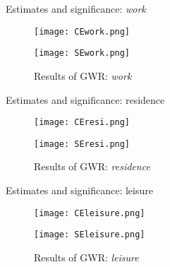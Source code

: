 \documentclass[aspectratio=169,xcolor=dvipsnames]{beamer}
\begin{document}
\begin{frame}{Estimates and significance: \textit{work}}
	\begin{figure}[h]
	\centering
	\begin{minipage}[b]{0.49\textwidth}
		\texttt{[image: CEwork.png]}
		\caption{Coefficient of \textit{work}}
		\label{fig:CE_work}
	\end{minipage}
	\hfill %
	\begin{minipage}[b]{0.49\textwidth}
		\texttt{[image: SEwork.png]}
		\caption{Significance of \textit{work}}
		\label{fig:SE_work}
	\end{minipage}
	\caption{Results of GWR: \textit{work}}
	\end{figure}
\end{frame}
\begin{frame}{Estimates and significance: residence}
	\begin{figure}[h]
		\centering
		\begin{minipage}[b]{0.49\textwidth}
			\texttt{[image: CEresi.png]}
			\caption{Coefficient of \textit{residence}}
			\label{fig:CE_resi}
		\end{minipage}
		\hfill %
		\begin{minipage}[b]{0.49\textwidth}
			\texttt{[image: SEresi.png]}
			\caption{Significance of \textit{residence}}
			\label{fig:SE_resi}
		\end{minipage}
		\caption{Results of GWR: \textit{residence}}
	\end{figure}
\end{frame}
\begin{frame}{Estimates and significance: leisure}
	\begin{figure}[h]
		\centering
		\begin{minipage}[b]{0.49\textwidth}
			\texttt{[image: CEleisure.png]}
			\caption{Coefficient of \textit{leisure}}
			\label{fig:CE_leisure}
		\end{minipage}
		\hfill %
		\begin{minipage}[b]{0.49\textwidth}
			\texttt{[image: SEleisure.png]}
			\caption{Significance of \textit{leisure}}
			\label{fig:SE_leisure}
		\end{minipage}
		\caption{Results of GWR: \textit{leisure}}
	\end{figure}
\end{frame}
\end{document}
